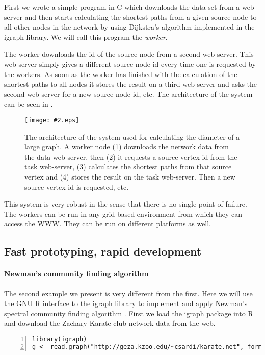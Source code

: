 \documentclass[twoside]{book}%
\newcommand{\figfigure}[2]{%
  \begin{psfrags}
  
  \texttt{[image: \#2.eps]}
  \end{psfrags}
}
\begin{document}
First we wrote a simple program in C which downloads the data set from
a web server and then starts calculating the shortest paths from a
given source node to all other nodes in the network by using
Dijkstra's algorithm \cite{dijkstra59} implemented in the igraph
library. We will call this program the \emph{worker}. 

The worker downloads the id of the source node from a second web
server. This web server simply gives a different source node id every
time one is requested by the workers. As soon as the worker has
finished with the calculation of the shortest paths to all nodes it
stores the result on a third web server and asks the second web-server
for a new source node id, etc. The architecture of the system can be
seen in 
. 

\begin{figure}
\centering
\figfigure{0.75\textwidth}{grid2}
\caption{The architecture of the system used for calculating the
  diameter of a large graph. A worker node (1) downloads the network
  data from the data web-server, then (2) it requests a source vertex
  id from the task web-server, (3) calculates the shortest paths from
  that source vertex and (4) stores the result on the task
  web-server. Then a new source vertex id is requested, etc.}
\end{figure}

This system is very robust in the sense that there is no single point
of failure. The workers can be run in any grid-based environment from
which they can access the WWW. They can be run on different platforms
as well.

\subsection{Fast prototyping, rapid development}

\paragraph{Newman's community finding algorithm}
The second example we present is very different from the first. Here
we will use the GNU R interface to the igraph library to implement
and apply Newman's spectral community finding algorithm
\cite{newman06}.
First we load the igraph package into R and download the Zachary
Karate-club network data \cite{zachary77} from the web.
\begin{Verbatim}[fontsize=\small,numbers=left]
library(igraph)
g <- read.graph("http://geza.kzoo.edu/~csardi/karate.net", format="pajek")
\end{Verbatim}
\end{document}
